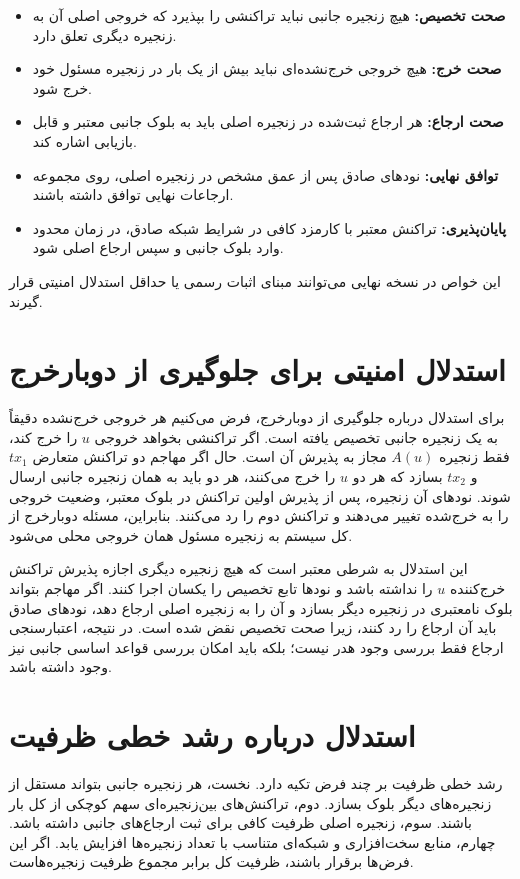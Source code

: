 \begin{itemize}
\item \textbf{صحت تخصیص:} هیچ زنجیره جانبی نباید تراکنشی را بپذیرد که خروجی اصلی آن به زنجیره دیگری تعلق دارد.
\item \textbf{صحت خرج:} هیچ خروجی خرج‌نشده‌ای نباید بیش از یک بار در زنجیره مسئول خود خرج شود.
\item \textbf{صحت ارجاع:} هر ارجاع ثبت‌شده در زنجیره اصلی باید به بلوک جانبی معتبر و قابل بازیابی اشاره کند.
\item \textbf{توافق نهایی:} نودهای صادق پس از عمق مشخص در زنجیره اصلی، روی مجموعه ارجاعات نهایی توافق داشته باشند.
\item \textbf{پایان‌پذیری:} تراکنش معتبر با کارمزد کافی در شرایط شبکه صادق، در زمان محدود وارد بلوک جانبی و سپس ارجاع اصلی شود.
\end{itemize}

این خواص در نسخه نهایی می‌توانند مبنای اثبات رسمی یا حداقل استدلال امنیتی قرار گیرند.

\section{استدلال امنیتی برای جلوگیری از دوبارخرج}

برای استدلال درباره جلوگیری از دوبارخرج، فرض می‌کنیم هر خروجی خرج‌نشده دقیقاً به یک زنجیره جانبی تخصیص یافته است. اگر تراکنشی بخواهد خروجی \(u\) را خرج کند، فقط زنجیره \(A(u)\) مجاز به پذیرش آن است. حال اگر مهاجم دو تراکنش متعارض \(tx_1\) و \(tx_2\) بسازد که هر دو \(u\) را خرج می‌کنند، هر دو باید به همان زنجیره جانبی ارسال شوند. نودهای آن زنجیره، پس از پذیرش اولین تراکنش در بلوک معتبر، وضعیت خروجی را به خرج‌شده تغییر می‌دهند و تراکنش دوم را رد می‌کنند. بنابراین، مسئله دوبارخرج از کل سیستم به زنجیره مسئول همان خروجی محلی می‌شود.

این استدلال به شرطی معتبر است که هیچ زنجیره دیگری اجازه پذیرش تراکنش خرج‌کننده \(u\) را نداشته باشد و نودها تابع تخصیص را یکسان اجرا کنند. اگر مهاجم بتواند بلوک نامعتبری در زنجیره دیگر بسازد و آن را به زنجیره اصلی ارجاع دهد، نودهای صادق باید آن ارجاع را رد کنند، زیرا صحت تخصیص نقض شده است. در نتیجه، اعتبارسنجی ارجاع فقط بررسی وجود هدر نیست؛ بلکه باید امکان بررسی قواعد اساسی جانبی نیز وجود داشته باشد.

\section{استدلال درباره رشد خطی ظرفیت}

رشد خطی ظرفیت بر چند فرض تکیه دارد. نخست، هر زنجیره جانبی بتواند مستقل از زنجیره‌های دیگر بلوک بسازد. دوم، تراکنش‌های بین‌زنجیره‌ای سهم کوچکی از کل بار باشند. سوم، زنجیره اصلی ظرفیت کافی برای ثبت ارجاع‌های جانبی داشته باشد. چهارم، منابع سخت‌افزاری و شبکه‌ای متناسب با تعداد زنجیره‌ها افزایش یابد. اگر این فرض‌ها برقرار باشند، ظرفیت کل برابر مجموع ظرفیت زنجیره‌هاست.

